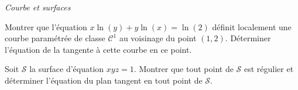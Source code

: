 \documentclass[a4paper,10pt]{report}
\begin{document}
\begin{center}
\textit{{ {\large Courbe et surfaces}}}
\end{center}

\medskip

\begin{Exercice}{} Montrer que l'équation $x\ln(y)+y \ln(x) = \ln(2)$ définit localement une courbe paramétrée de classe $\mathcal{C}^1$ au voisinage du point $(1,2)$. Déterminer l'équation de la tangente à cette courbe en ce point.
\end{Exercice}


\begin{Exercice}{} Soit $\mathcal{S}$ la surface d'équation $xyz=1$. Montrer que tout point de $\mathcal{S}$ est régulier et déterminer l'équation du plan tangent en tout point de $\mathcal{S}$.
\end{Exercice}

%
%
\end{document}
